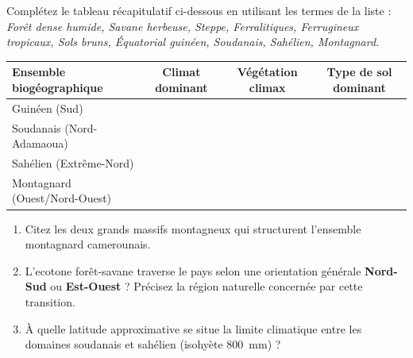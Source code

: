 \documentclass[11pt]{article}
\begin{document}
\begin{exercice}
Complétez le tableau récapitulatif ci-dessous en utilisant les termes de la liste : \textit{Forêt dense humide, Savane herbeuse, Steppe, Ferralitiques, Ferrugineux tropicaux, Sols bruns, Équatorial guinéen, Soudanais, Sahélien, Montagnard.}

\begin{tabularx}{\linewidth}{|X|c|c|c|}
\hline
\textbf{Ensemble biogéographique} & \textbf{Climat dominant} & \textbf{Végétation climax} & \textbf{Type de sol dominant} \\
\hline
Guinéen (Sud) &  &  &  \\
\hline
Soudanais (Nord-Adamaoua) &  &  &  \\
\hline
Sahélien (Extrême-Nord) &  &  &  \\
\hline
Montagnard (Ouest/Nord-Ouest) &  &  &  \\
\hline
\end{tabularx}
\end{exercice}

\begin{exercice}
\begin{enumerate}
    \item Citez les deux grands massifs montagneux qui structurent l'ensemble montagnard camerounais.
    \item L'ecotone forêt-savane traverse le pays selon une orientation générale \textbf{Nord-Sud} ou \textbf{Est-Ouest} ? Précisez la région naturelle concernée par cette transition.
    \item À quelle latitude approximative se situe la limite climatique entre les domaines soudanais et sahélien (isohyète \SI{800}{mm}) ?
\end{enumerate}
\end{exercice}
\end{document}
